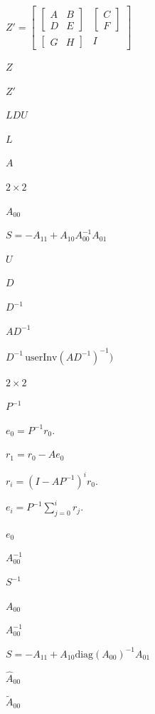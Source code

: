 \documentclass{article}
\begin{document}
$ Z' = \left[\begin{array}{cc}
    \left[\begin{array}{cc}
       A & B \\
       D & E
    \end{array}\right] &
    \left[\begin{array}{c}
    C \\ F \end{array}\right] \\
    \left[\begin{array}{cc}
      G & H
    \end{array}\right] & I
    \end{array}\right]$
\pagebreak

$Z$
\pagebreak

$Z'$
\pagebreak

$ LDU $
\pagebreak

$ L $
\pagebreak

$ A $
\pagebreak

$ 2 \times 2 $
\pagebreak

$ A_{00} $
\pagebreak

$ S = -A_{11} + A_{10} A_{00}^{-1} A_{01} $
\pagebreak

$ U $
\pagebreak

$D$
\pagebreak

$D^{-1}$
\pagebreak

$ A D^{-1}$
\pagebreak

$D^{-1} \, \mbox{userInv} (A D^{-1})^{-1})$
\pagebreak

$2\times2$
\pagebreak

$P^{-1}$
\pagebreak

$  e_0 = P^{-1} r_0.
$
\pagebreak

$r_1 = r_0 - A e_0$
\pagebreak

$  r_i = (I - A P^{-1})^i r_0.
$
\pagebreak

$  e_i = P^{-1} \sum_{j=0}^i r_j.
$
\pagebreak

$e_0$
\pagebreak

$A_00^{-1}$
\pagebreak

$S^{-1}$
\pagebreak

$A_00$
\pagebreak

$A_{00}^{-1}$
\pagebreak

$ S = -A_{11} + A_{10} \mbox{diag}(A_{00})^{-1} A_{01} $
\pagebreak

$ \hat{A}_{00} $
\pagebreak

$ \tilde{A}_{00} $
\pagebreak
\end{document}
